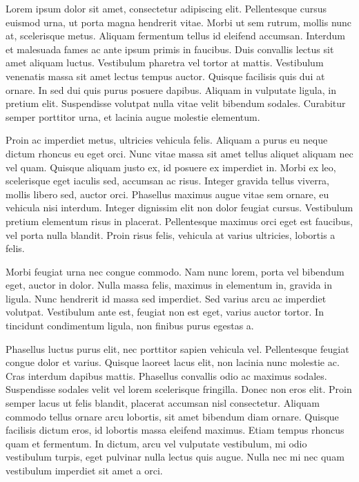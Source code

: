 \documentclass[../Paper.tex]{subfiles}
\begin{document}
\raggedright
Lorem ipsum dolor sit amet\cite{andrews_tischer_siedler_pebody_2008}, consectetur adipiscing elit. Pellentesque cursus
euismod urna, ut porta magna hendrerit vitae. Morbi ut sem rutrum, mollis nunc at,
scelerisque metus. Aliquam fermentum tellus id eleifend accumsan. Interdum et malesuada
fames ac ante ipsum primis in faucibus. Duis convallis lectus sit amet aliquam luctus.
Vestibulum pharetra vel tortor at mattis. Vestibulum venenatis massa sit amet lectus
tempus auctor\cite{world_health_organization_2017}. Quisque facilisis quis dui at ornare. In sed dui quis purus posuere
dapibus. Aliquam in vulputate ligula, in pretium elit. Suspendisse volutpat nulla
vitae velit bibendum sodales. Curabitur semper porttitor urna, et lacinia augue
molestie elementum.

Proin ac imperdiet metus, ultricies vehicula felis. Aliquam a purus eu neque dictum
rhoncus eu eget orci. Nunc vitae massa sit amet tellus aliquet aliquam nec vel quam.
Quisque aliquam justo ex, id posuere ex imperdiet in. Morbi ex leo, scelerisque eget
iaculis sed, accumsan ac risus. Integer gravida tellus viverra, mollis libero sed, auctor
orci. Phasellus maximus augue vitae sem ornare, eu vehicula nisi interdum.
Integer dignissim elit non dolor feugiat cursus. Vestibulum pretium elementum risus
in placerat. Pellentesque maximus orci eget est faucibus, vel porta nulla blandit.
Proin risus felis, vehicula at varius ultricies, lobortis a felis.

Morbi feugiat urna nec congue commodo. Nam nunc lorem, porta vel bibendum eget,
auctor in dolor. Nulla massa felis, maximus in elementum in, gravida in ligula.
Nunc hendrerit id massa sed imperdiet. Sed varius arcu ac imperdiet volutpat.
Vestibulum ante est, feugiat non est eget, varius auctor tortor. In tincidunt
condimentum ligula, non finibus purus egestas a.

Phasellus luctus purus elit, nec porttitor sapien vehicula vel\cite{sniadack_crowcroft_durrheim_rota_2017}.
Pellentesque feugiat congue dolor et varius. Quisque laoreet lacus elit, non lacinia nunc
molestie ac. Cras interdum dapibus mattis. Phasellus convallis odio ac maximus
sodales. Suspendisse sodales velit vel lorem scelerisque fringilla. Donec non eros
elit. Proin semper lacus ut felis blandit, placerat accumsan nisl consectetur.
Aliquam commodo tellus ornare arcu lobortis, sit amet bibendum diam ornare.
Quisque facilisis dictum eros, id lobortis massa eleifend maximus. Etiam tempus
rhoncus quam et fermentum. In dictum, arcu vel vulputate vestibulum, mi odio
vestibulum turpis, eget pulvinar nulla lectus quis augue. Nulla nec mi nec quam
vestibulum imperdiet sit amet a orci.
\end{document}
